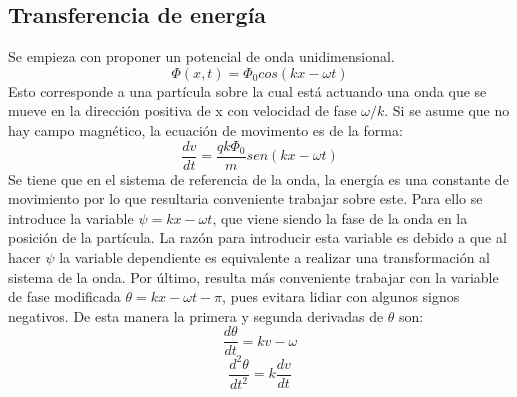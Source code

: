 \documentclass[12pt]{article}
\begin{document}
\subsection*{Transferencia de energía}
Se empieza con proponer un potencial de onda unidimensional.
\begin{equation}
\label{eq:potencial_sinosoidal}
\Phi(x,t) = \Phi_0 cos(kx-\omega t)
\end{equation}
Esto corresponde a una partícula sobre la cual está actuando una onda que se mueve en la dirección positiva de x con velocidad de fase $\omega /k$. Si se asume que no hay campo magnético, la ecuación de movimento es de la forma:
\begin{equation}
\label{eq:mov_sin_particula}
\frac{dv}{dt}=\frac{qk\Phi_0}{m}sen(kx-\omega t)
\end{equation}
Se tiene que en el sistema de referencia de la onda, la energía es una constante de movimiento por lo que resultaria conveniente trabajar sobre este. Para ello se introduce la variable $\psi= kx - \omega t$, que viene siendo la fase de la onda en la posición de la partícula. La razón para introducir esta variable es debido a que al hacer $\psi$ la variable dependiente es equivalente a realizar una transformación al sistema de la onda. Por último, resulta más conveniente trabajar con la variable de fase modificada $\theta = kx -\omega t -\pi$, pues evitara lidiar con algunos signos negativos. De esta manera la primera y segunda derivadas de $\theta$ son:
\begin{equation}
\label{eq:deriv_theta}
\frac{d\theta}{dt}=kv -\omega
\end{equation}
\begin{equation}
\label{eq:segunda_deriv_theta}
\frac{d^2\theta}{dt^2}=k \frac{dv}{dt}
\end{equation}
\end{document}
